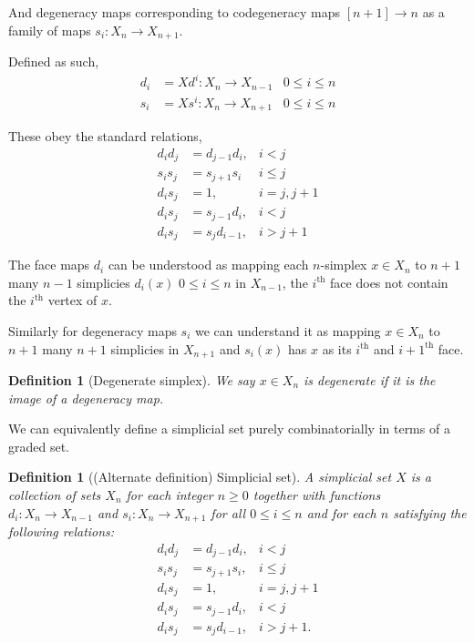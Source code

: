 \documentclass[12pt]{report}
\numberwithin{equation}{section}
\newtheorem{definition}[dummy]{Definition}
\begin{document}
	And degeneracy maps corresponding to codegeneracy maps $ [n+1] \to n$ as a family of maps $s_i: X_n \to X_{n+1}$.
	
	Defined as such,
	\begin{align*}
		d_i &= X d^i : X_n \to X_{n-1} & 0 \leq i \leq n \\
		s_i &= X s^i : X_n \to X_{n+1} & 0 \leq i \leq n
	\end{align*}
	
	
	These obey the standard relations,
	\begin{align*}
		d_id_j &= d_{j-1}d_i, &i <j\\
		s_is_j&=s_{j+1}s_i &i \leq j\\
		d_is_j&=1, &i=j,j+1\\
		d_is_j&=s_{j-1}d_i,& i<j\\
		d_is_j&=s_jd_{i-1},& i>j+1
	\end{align*}
	
	The face maps $d_i$ can be understood as mapping each $n$-simplex $x\in X_n$ to $n+1$ many $n-1$ simplicies $d_i(x)$ $0\leq i \leq n$ in $X_{n-1} $, the $i^\mathrm{th}$ face does not contain the $i^{\mathrm{th}}$ vertex of $x$. 
	
	Similarly for degeneracy maps $s_i$ we can understand it as mapping $x \in X_n $ to $n+1$ many $n+1$ simplicies in $X_{n+1} $ and $s_i(x)$ has $x$ as its $i^{\mathrm{th}} $ and $i+1^{\mathrm{th}}$ face. 
	
	\begin{definition}[Degenerate simplex]
		We say $x \in X_n$ is degenerate if it is the image of a degeneracy map.
	\end{definition}
	
	We can equivalently define a simplicial set purely combinatorially in terms of a graded set.
	\begin{definition}[(Alternate definition) Simplicial set]
		A \textit{simplicial set} \( X \) is a collection of sets \( X_n \) for each integer \( n \geq 0 \) together with functions 
		\( d_i : X_n \to X_{n-1} \) and \( s_i : X_n \to X_{n+1} \) for all \( 0 \leq i \leq n \) and for each \( n \) satisfying the following relations:  
		\begin{align*}
			d_i d_j &= d_{j-1} d_i, & i < j \\
			s_i s_j &= s_{j+1} s_i, & i \leq j \\
			d_i s_j &= 1, & i = j, j+1 \\
			d_i s_j &= s_{j-1} d_i, & i < j \\
			d_i s_j &= s_j d_{i-1}, & i > j+1.
		\end{align*}
	\end{definition}
	
\end{document}
